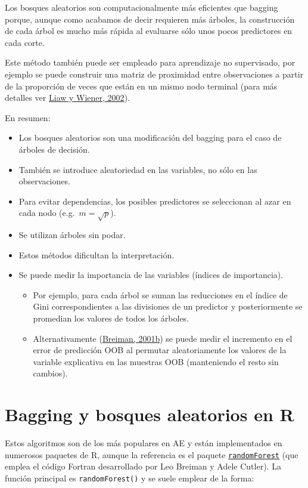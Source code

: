\documentclass[
  spanish,
]{book}
\theoremstyle{break}
\theoremstyle{definition}
\theoremstyle{definition}
\theoremstyle{definition}
\theoremstyle{definition}
\theoremstyle{remark}
\begin{document}
Los bosques aleatorios son computacionalmente más eficientes que bagging porque, aunque como acabamos de decir requieren más árboles, la construcción de cada árbol es mucho más rápida al evaluarse sólo unos pocos predictores en cada corte.

Este método también puede ser empleado para aprendizaje no supervisado,
por ejemplo se puede construir una matriz de proximidad entre observaciones a partir de la proporción de veces que están en un mismo nodo terminal (para más detalles ver \protect\hyperlink{ref-liaw2002classification}{Liaw y Wiener, 2002}).

En resumen:

\begin{itemize}
\item
  Los bosques aleatorios son una modificación del bagging para el caso de árboles de decisión.
\item
  También se introduce aleatoriedad en las variables, no sólo en las observaciones.
\item
  Para evitar dependencias, los posibles predictores se seleccionan al azar en cada nodo (e.g.~\(m=\sqrt{p}\)).
\item
  Se utilizan árboles sin podar.
\item
  Estos métodos dificultan la interpretación.
\item
  Se puede medir la importancia de las variables (índices de importancia).

  \begin{itemize}
  \item
    Por ejemplo, para cada árbol se suman las reducciones en el
    índice de Gini correspondientes a las divisiones de un
    predictor y posteriormente se promedian los valores de todos
    los árboles.
  \item
    Alternativamente (\protect\hyperlink{ref-breiman2001statistical}{Breiman, 2001b}) se puede medir el incremento en el error de
    predicción OOB al permutar aleatoriamente los valores de la
    variable explicativa en las muestras OOB (manteniendo el resto
    sin cambios).
  \end{itemize}
\end{itemize}

\hypertarget{bagging-rf-r}{%
\section{Bagging y bosques aleatorios en R}\label{bagging-rf-r}}

Estos algoritmos son de los más populares en AE y están implementados en numerosos paquetes de R, aunque la referencia es el paquete \href{https://CRAN.R-project.org/package=randomForest}{\texttt{randomForest}} (que emplea el código Fortran desarrollado por Leo Breiman y Adele Cutler).
La función principal es \texttt{randomForest()} y se suele emplear de la forma:
\end{document}
